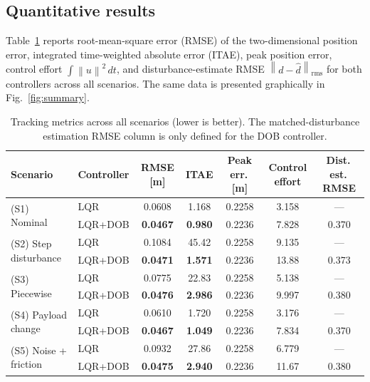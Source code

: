 \documentclass[conference]{IEEEtran}
\newcommand{\norm}[1]{\left\lVert#1\right\rVert}
\begin{document}
\subsection{Quantitative results}

Table~\ref{tab:metrics} reports root-mean-square error (RMSE) of the
two-dimensional position error, integrated time-weighted absolute error
(ITAE), peak position error, control effort
$\int\norm u^2\,dt$, and disturbance-estimate RMSE
$\norm{d-\hat d}_{\mathrm{rms}}$ for both controllers across all scenarios.
The same data is presented graphically in Fig.~\ref{fig:summary}.

\begin{table}[t]
  \centering
  \caption{Tracking metrics across all scenarios (lower is better). The
  matched-disturbance estimation RMSE column is only defined for the DOB
  controller.}
  \label{tab:metrics}
  \begin{tabular}{llccccc}
    \toprule
    Scenario & Controller & RMSE [m] & ITAE & Peak err.\,[m] & Control effort & Dist.\,est.\,RMSE\\
    \midrule
    \multirow{2}{*}{(S1) Nominal}              & LQR     & 0.0608 & 1.168  & 0.2258 & 3.158  & ---\\
                                                 & LQR+DOB & \textbf{0.0467} & \textbf{0.980}  & 0.2236 & 7.828  & 0.370\\
    \multirow{2}{*}{(S2) Step disturbance}     & LQR     & 0.1084 & 45.42  & 0.2258 & 9.135  & ---\\
                                                 & LQR+DOB & \textbf{0.0471} & \textbf{1.571}  & 0.2236 & 13.88  & 0.373\\
    \multirow{2}{*}{(S3) Piecewise}            & LQR     & 0.0775 & 22.83  & 0.2258 & 5.138  & ---\\
                                                 & LQR+DOB & \textbf{0.0476} & \textbf{2.986}  & 0.2236 & 9.997  & 0.380\\
    \multirow{2}{*}{(S4) Payload change}       & LQR     & 0.0610 & 1.720  & 0.2258 & 3.176  & ---\\
                                                 & LQR+DOB & \textbf{0.0467} & \textbf{1.049}  & 0.2236 & 7.834  & 0.370\\
    \multirow{2}{*}{(S5) Noise + friction}     & LQR     & 0.0932 & 27.86  & 0.2258 & 6.779  & ---\\
                                                 & LQR+DOB & \textbf{0.0475} & \textbf{2.940}  & 0.2236 & 11.67  & 0.380\\
    \bottomrule
  \end{tabular}
\end{table}
\end{document}
